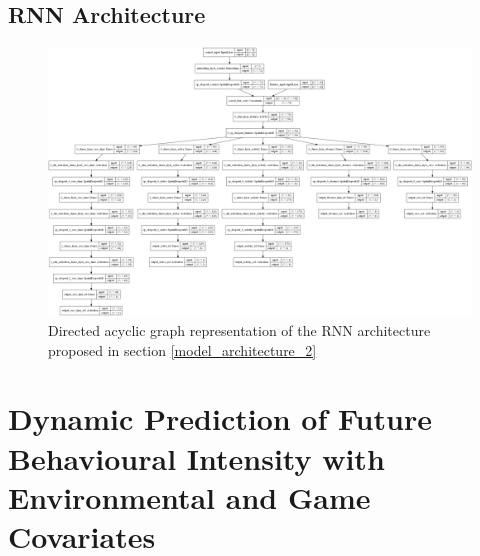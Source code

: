 \subsection{RNN Architecture}

\begin{figure}[H]
\centering
\includegraphics[width=\textwidth,height=\textheight,keepaspectratio]{images/appendix_B/rnn_2.png}
\caption[\textbf{RNN DAG  - Section \ref{model_architecture_2}}]{Directed acyclic graph representation of the RNN architecture proposed in section \ref{model_architecture_2}}
\label{rnn_2_dag}
\end{figure}

\section{Dynamic Prediction of Future Behavioural Intensity with Environmental and Game Covariates}

